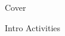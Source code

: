 \documentclass[oneside]{bookest}
\newcommand{\sectiondir}{sections/}
\begin{document}
{Cover}
\maketitle

\frontmatter
\tableofcontents
\thispagestyle{empty}
\mainmatter

\onehalfspacing %
{Intro}
{Activities}
\end{document}
